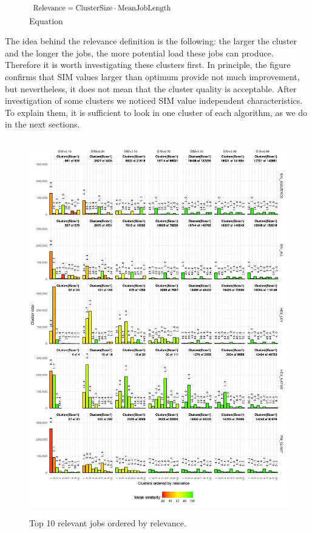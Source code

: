 \documentclass[]{llncs}
\begin{document}
\begin{figure}		
  \centering
  \includegraphics[width=2.5in,height=0.12in]{./media/image16.png}
  \caption{Equation}
  \label{fig:equation}
\end{figure}


The idea behind the relevance definition is the following: the larger the cluster and the longer the jobs, the more potential load these jobs can produce.
Therefore it is worth investigating these clusters first.
In principle, the figure confirms that SIM values larger than optimum provide not much improvement, but nevertheless, it does not mean that the cluster quality is acceptable.
After investigation of some clusters we noticed SIM value independent characteristics.
To explain them, it is sufficient to look in one cluster of each algorithm, as we do in the next sections.

\begin{figure}
  \centering
   \includegraphics[width=4.61in,height=6.44in]{./media/image11.png}
   \caption{Top 10 relevant jobs ordered by relevance.}
   \label{fig:top10_relevant_jobs}
\end{figure}
\end{document}
